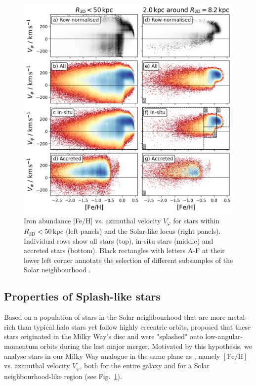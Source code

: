 \documentclass[fleqn,usenatbib]{mnras}
\begin{document}
\begin{figure}
    \centering
    \includegraphics[width=\columnwidth]{figures/splash_feh_vphi.png}
    \caption{{Iron abundance [Fe/H]} vs. azimuthal velocity $V_\varphi$ for stars within $R_\mathrm{3D} < 50\,\mathrm{kpc}$ (left panels) and the Solar-like locus (right panels). Individual rows show all stars (top), in-situ stars (middle) and accreted stars (bottom). Black rectangles with letters A-F at their lower left corner annotate the selection of different subsamples of the Solar neighbourhood \href{https://github.com/svenbuder/gse_nihaouhd/tree/main/figures}{\faGithub}.}
    \label{fig:splash_feh_vphi}
\end{figure}

\subsection{Properties of Splash-like stars}

Based on a population of stars in the Solar neighbourhood that are more metal-rich than typical halo stars yet follow highly eccentric orbits, \citet{Belokurov2020} proposed that these stars originated in the Milky Way’s disc and were "splashed" onto low-angular-momentum orbits during the last major merger. Motivated by this hypothesis, we analyse stars in our Milky Way analogue in the same plane as \citet{Belokurov2020}, namely $\mathrm{[Fe/H]}$ vs. azimuthal velocity $V_\varphi$, both for the entire galaxy and for a Solar neighbourhood-like region (see Fig.~\ref{fig:splash_feh_vphi}).
\end{document}
